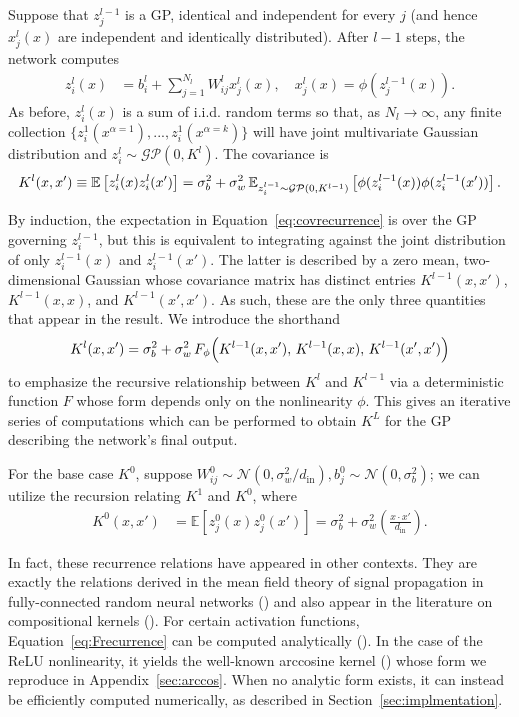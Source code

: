 \documentclass{article} %
\begin{document}
Suppose that $z^{l-1}_j$ is a GP, identical and independent for every $j$ (and hence $x^l_j(x)$ are independent and identically distributed). After $l-1$ steps, the network computes
\begin{align}
z^{l}_{i}(x) &= b^l_i + \sum_{j=1}^{N_l} W^{l}_{ij} x^l_j(x), \quad x^l_j(x) = \phi(z^{l-1}_j(x)).
\end{align}
As before, $z^{l}_i(x)$ is a sum of i.i.d. random terms so that, as $N_l \rightarrow \infty$, any finite collection $\{z^1_i(x^{\alpha=1}), ..., z^1_i(x^{\alpha=k})\}$ will have joint multivariate Gaussian distribution and $z^{l}_i \sim \mathcal{GP}(0, K^{l})$. The covariance is
\begin{align}
\centering
K^{l}(x,x') \equiv \mathbb{E}\left[z^{l}_{i}(x) z^{l}_{i}(x') \right] = \sigma^2_b + \sigma^2_w \, \mathbb{E}_{z^{l-1}_i \sim \mathcal{GP}(0, K^{l-1})} \left[ \phi(z^{l-1}_i(x)) \phi(z^{l-1}_i(x')) \right].
\label{eq:covrecurrence}
\end{align}

By induction, the expectation in Equation~\ref{eq:covrecurrence} is over the GP governing $z^{l-1}_i$, but this is equivalent to integrating against the joint distribution of only $z^{l-1}_i(x)$ and $z^{l-1}_i(x')$. The latter is described by a zero mean, two-dimensional Gaussian whose covariance matrix has distinct entries $K^{l-1}(x,x')$, $K^{l-1}(x,x)$, and $K^{l-1}(x',x')$. As such, these are the only three quantities that appear in the result. We introduce the shorthand
\begin{align}
\centering
K^{l}(x,x') = \sigma^2_b + \sigma^2_w \, F_{\phi}\Big(K^{l-1}(x,x'),\,K^{l-1}(x,x),\,K^{l-1}(x',x') \Big)
\label{eq:Frecurrence}
\end{align}
to emphasize the recursive relationship between $K^{l}$ and $K^{l-1}$ via a deterministic function $F$ whose form depends only on the nonlinearity $\phi$. This gives an iterative series of computations which can be performed to obtain $K^{L}$ for the GP describing the network's final output. 


For the base case $K^0$, suppose $W^{0}_{ij} \sim \mathcal{N}(0, \sigma^2_w/d_{\text{in}}), b^{0}_{j} \sim \mathcal{N}(0, \sigma^2_b)$; we can utilize the recursion relating $K^1$ and $K^0$, where
\begin{align}
K^{0}(x,x') &= \mathbb{E} \left[z^0_j(x) z^0_j(x') \right] = \sigma^2_b + \sigma^2_w \left(\tfrac{x \cdot x'}{d_{\text{in}}} \right).
\end{align}


In fact, these recurrence relations have appeared in other contexts. They are exactly the relations derived in the mean field theory of signal propagation in fully-connected random neural networks (\cite{poole2016exponential,schoenholz2016}) and also appear in the literature on compositional kernels (\cite{cho2009, daniely2016}). For certain activation functions, Equation~\ref{eq:Frecurrence} can be computed analytically (\cite{cho2009, daniely2016}). In the case of the ReLU nonlinearity, it yields the well-known arccosine kernel (\cite{cho2009}) whose form we reproduce in Appendix~\ref{sec:arccos}. When no analytic form exists, it can instead be efficiently computed numerically, as described in Section~\ref{sec:implmentation}.
\end{document}
